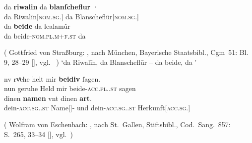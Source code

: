 \begin{exe}
\ex \label{ex:askedal73pr}
	\begin{xlist}
	\ex \label{ex:askedal73pr_1}
		\gll da \textbf{riwalin} da {\textbf{blanſcheflur} ·} \\
			da Riwalīn[\textsc{nom.sg.\MascM}] da
				Blanscheflūr[\textsc{nom.sg.\FemF}] \\
	\sn \gll da \textbf{beide} da lealamûr \\
			da beide-\textsc{nom.pl.m+f\subMF.st} da  \\
		\begin{taggedline}{(%
				Gottfried von Straßburg: ,
				nach München, Bayerische Staatsbibl., Cgm~51: Bl. 9, 28--29
				[\cite[1286]{hsc}],
				vgl.~\cite[22~{[=~V.~1359--1360]}]{maroldschroeder1969}%
			)}
		\trans `da Riwalīn, da Blanscheflūr -- da beide, da '
		\end{taggedline}

	\ex \label{ex:askedal73pr_2}
		\gll nv rvͦche helt mir \textbf{beidiv} ſagen. \\
			nun geruhe Held mir beide-\textsc{acc.pl.\NeutI.st} sagen \\
	\sn \gll dinen \textbf{namen} vnt dinen \textbf{art}. \\
			dein-\textsc{acc.sg.\MascI.st} Name[\textsc{\MascI}]-\textsc{\Obl}
			und dein-\textsc{acc.sg.\MascI.st}
			Herkunft[\textsc{acc.sg.\MascI}] \\
		\begin{taggedline}{(%
				Wolfram von Eschenbach: \tit{Parzival},
				nach St.~Gallen, Stiftsbibl., Cod.~Sang.~857: S.~265\tsup{a}, 33--34
				[\cite[1211]{hsc}],
				vgl.~\cite[749~{[=~745.18--19]}]{knechtschirok2003})}
		\trans {}\footnotemark
		\end{taggedline}
	\end{xlist}
\end{exe}
%

